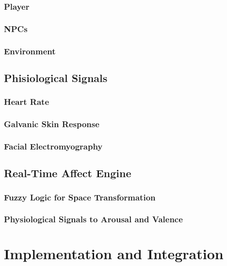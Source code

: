 \documentclass{uofsthesis-cs}
\begin{document}
\subsection{Player}
\subsection{NPCs}
\subsection{Environment}

\section{Phisiological Signals}
\subsection{Heart Rate}
\subsection{Galvanic Skin Response}
\subsection{Facial Electromyography}

\section{Real-Time Affect Engine}
\subsection{Fuzzy Logic for Space Transformation}
\subsection{Physiological Signals to Arousal and Valence}


\chapter{Implementation and Integration}
\label{chap:impl}
\end{document}
